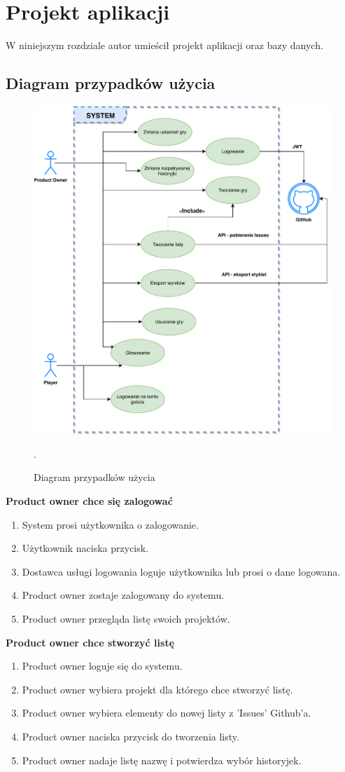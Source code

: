 \chapter{Projekt aplikacji}
W niniejszym rozdziale autor umieścił projekt aplikacji oraz bazy danych.
\section{Diagram przypadków użycia}
\begin{figure}[H]
	\centering\includegraphics[width=.9\textwidth]{img/useCase}
	\caption{Diagram przypadków użycia}.
	\label{rys:useCase}
\end{figure}
\textbf{Product owner chce się zalogować}
\begin{enumerate}
    \item System prosi użytkownika o zalogowanie.
    \item Użytkownik naciska przycisk.
    \item Dostawca usługi logowania loguje użytkownika lub prosi o dane logowana.
    \item Product owner zostaje zalogowany do systemu.
    \item Product owner przegląda listę swoich projektów.
\end{enumerate}
\textbf{Product owner chce stworzyć listę}
\begin{enumerate}
    \item Product owner loguje się do systemu.
    \item Product owner wybiera projekt dla którego chce stworzyć listę.
    \item Product owner wybiera elementy do nowej listy z 'Issues' Github'a.
    \item Product owner naciska przycisk do tworzenia listy.
    \item Product owner nadaje listę nazwę i potwierdza wybór historyjek.
\end{enumerate}
